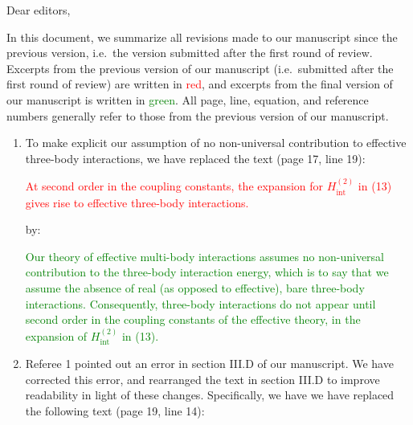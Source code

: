 \documentclass[preprint,showkeys,nofootinbib]{revtex4-1}
\renewcommand{\t}{\text} %
\newcommand{\1}{\mathds{1}}
\newcommand{\red}[1]{\textcolor{red}{#1}}
\newcommand{\green}[1]{\textcolor{green}{#1}}
\newcounter{point}
\begin{document}
Dear editors,

In this document, we summarize all revisions made to our manuscript
since the previous version, i.e.~the version submitted after the first
round of review.  Excerpts from the previous version of our manuscript
(i.e.~submitted after the first round of review) are written in
\red{red}, and excerpts from the final version of our manuscript is
written in \green{green}.  All page, line, equation, and reference
numbers generally refer to those from the previous version of our
manuscript.

\begin{enumerate}
\item To make explicit our assumption of no non-universal contribution
  to effective three-body interactions, we have replaced the text
  (page 17, line 19):

  \red{At second order in the coupling constants, the expansion for
    $H_{\t{int}}^{(2)}$ in (13) gives rise to effective three-body
    interactions.}

  by:

  \green{Our theory of effective multi-body interactions assumes no
    non-universal contribution to the three-body interaction energy,
    which is to say that we assume the absence of real (as opposed to
    effective), bare three-body interactions.  Consequently,
    three-body interactions do not appear until second order in the
    coupling constants of the effective theory, in the expansion of
    $H_{\t{int}}^{(2)}$ in (13).}


\item Referee 1 pointed out an error in section III.D of our
  manuscript.  We have corrected this error, and rearranged the text
  in section III.D to improve readability in light of these changes.
  Specifically, we have we have replaced the following text (page 19,
  line 14):


\end{enumerate}
\end{document}
